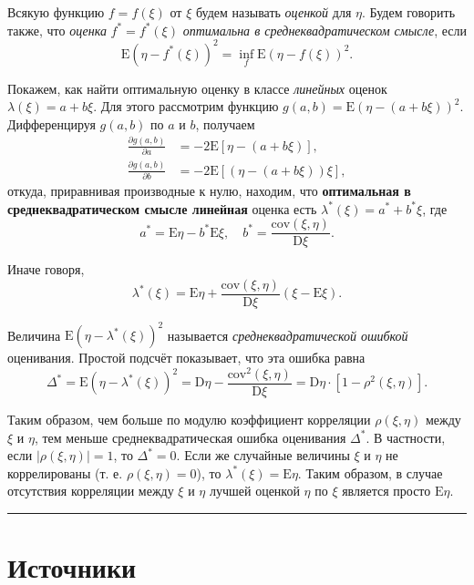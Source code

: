 \documentclass[11pt,a4paper]{article}
\begin{document}
Всякую функцию \(f = f(\xi)\) от \(\xi\) будем называть \emph{оценкой}
для \(\eta\). Будем говорить также, что \emph{оценка}
\(f^\ast = f^\ast(\xi)\) \emph{оптимальна в среднеквадратическом
смысле}, если
\[ \mathrm{E}(\eta − f^\ast(\xi))^2 = \inf_f \mathrm{E}(\eta − f(\xi))^2. \]

Покажем, как найти оптимальную оценку в классе \emph{линейных} оценок
\(\lambda(\xi) = a + b\xi\). Для этого рассмотрим функцию
\(g(a, b) = \mathrm{E}(\eta − (a+b\xi))^2\). Дифференцируя \(g(a, b)\)
по \(a\) и \(b\), получаем \[
\begin{split}
    \frac{\partial g(a, b)}{\partial a} &= −2 \mathrm{E} \left[ \eta − (a+b\xi) \right], \\
    \frac{\partial g(a, b)}{\partial b} &= −2 \mathrm{E} \left[ (\eta − (a+b\xi))\xi \right],
\end{split}
\] откуда, приравнивая производные к нулю, находим, что
\textbf{оптимальная в среднеквадратическом смысле линейная} оценка есть
\(\lambda^\ast (\xi) = a^\ast + b^\ast \xi\), где \[
    a^\ast = \mathrm{E}\eta − b^\ast\mathrm{E}\xi, \quad b^\ast = \frac{\mathrm{cov}(\xi, \eta)}{\mathrm{D}\xi}.
\]

Иначе говоря, \[
    \lambda^\ast(\xi) = \mathrm{E}\eta + \frac{\mathrm{cov}(\xi, \eta)}{\mathrm{D}\xi} (\xi - \mathrm{E}\xi).
\]

Величина \(\mathrm{E}(\eta − \lambda^\ast(\xi))^2\) называется
\emph{среднеквадратической ошибкой} оценивания. Простой подсчёт
показывает, что эта ошибка равна \[
\Delta^\ast = \mathrm{E}(\eta − \lambda^\ast(\xi))^2 = \mathrm{D}\eta − \frac{\mathrm{cov}^2(\xi, \eta)}{\mathrm{D}\xi} = \mathrm{D}\eta \cdot [1 - \rho^2(\xi, \eta)].
\]

Таким образом, чем больше по модулю коэффициент корреляции
\(\rho(\xi, \eta)\) между \(\xi\) и \(\eta\), тем меньше
среднеквадратическая ошибка оценивания \(\Delta^\ast\). В частности,
если \(|\rho(\xi, \eta)|=1\), то \(\Delta^\ast = 0\). Если же случайные
величины \(\xi\) и \(\eta\) не коррелированы (т. е.
\(\rho(\xi, \eta)=0\)), то \(\lambda^\ast(\xi) = \mathrm{E}\eta\). Таким
образом, в случае отсутствия корреляции между \(\xi\) и \(\eta\) лучшей
оценкой \(\eta\) по \(\xi\) является просто \(\mathrm{E}\eta\).

    \begin{center}\rule{0.5\linewidth}{0.5pt}\end{center}

    \hypertarget{ux438ux441ux442ux43eux447ux43dux438ux43aux438}{%
\section{Источники}\label{ux438ux441ux442ux43eux447ux43dux438ux43aux438}}
\end{document}
